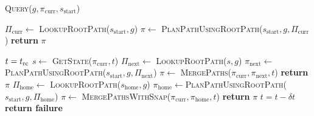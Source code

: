 \begin{algorithm}
\caption{\textsc{Query}($g, \pi_{\textrm{curr}},s_{\textrm{start}}$)}\label{alg:3}  
\begin{algorithmic}[1]
    \State $\Pi_{\textrm{curr}} \leftarrow$ \textsc{LookupRootPath}($s_{\textrm{start}},g$)
        \State $\pi \leftarrow$ \textsc{PlanPathUsingRootPath}($s_{\textrm{start}},g,\Pi_{\textrm{curr}}$)
        \State \textbf{return} $\pi$
    \EndIf

\State $t = t_{\textrm{rc}}$
    \State $s \leftarrow$ \textsc{GetState}($\pi_{\textrm{curr}}, t$)
    \State $\Pi_{\textrm{next}} \leftarrow$  \textsc{LookupRootPath}($s,g$)
        \State $\pi_{\textrm{next}} \leftarrow$\textsc{PlanPathUsingRootPath}($s_{\textrm{start}},g,\Pi_{\textrm{next}}$)
        \State $\pi \leftarrow$ \textsc{MergePaths}($\pi_{\textrm{curr}},\pi_{\textrm{next}},t$)
        \State \textbf{return} $\pi$
    \EndIf
    {\color{blue}
    \State $\Pi_{\textrm{home}} \leftarrow$ \textsc{LookupRootPath}($s_{\textrm{home}},g$)
            \State $\pi_{\textrm{home}} \leftarrow$\textsc{PlanPathUsingRootPath}($s_{\textrm{start}},g,\Pi_{\textrm{home}}$)
            \State $\pi \leftarrow$ \textsc{MergePathsWithSnap}($\pi_{\textrm{curr}},\pi_{\textrm{home}}, t$)
            \State \textbf{return} $\pi$
        \EndIf
    \EndIf
    }
    \State $t = t - \delta t$
\EndWhile
\State \textbf{return failure}
\end{algorithmic}
\end{algorithm}

